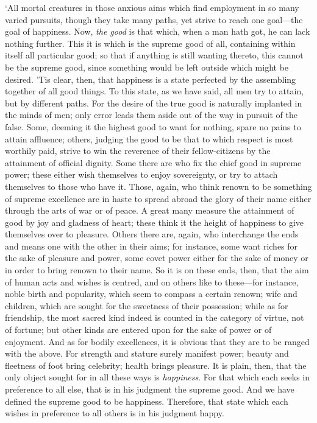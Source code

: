 \documentclass[12pt]{book}
\begin{document}
`All mortal creatures in those anxious aims which find employment in so
many varied pursuits, though they take many paths, yet strive to reach
one goal---the goal of happiness. Now, \emph{the good} is that which, when a
man hath got, he can lack nothing further. This it is which is the
supreme good of all, containing within itself all particular good; so
that if anything is still wanting thereto, this cannot be the supreme
good, since something would be left outside which might be desired. 'Tis
clear, then, that happiness is a state perfected by the assembling
together of all good things. To this state, as we have said, all men try
to attain, but by different paths. For the desire of the true good is
naturally implanted in the minds of men; only error leads them aside out
of the way in pursuit of the false. Some, deeming it the highest good to
want for nothing, spare no pains to attain affluence; others, judging
the good to be that to which respect is most worthily paid, strive to
win the reverence of their fellow-citizens by the attainment of official
dignity. Some there are who fix the chief good in supreme power; these
either wish themselves to enjoy sovereignty, or try to attach themselves
to those who have it. Those, again, who think renown to be something of
supreme excellence are in haste to spread abroad the glory of their name
either through the arts of war or of peace. A great many measure the
attainment of good by joy and gladness of heart; these think it the
height of happiness to give themselves over to pleasure. Others there
are, again, who interchange the ends and means one with the other in
their aims; for instance, some want riches for the sake of pleasure and
power, some covet power either for the sake of money or in order to
bring renown to their name. So it is on these ends, then, that the aim
of human acts and wishes is centred, and on others like to these---for
instance, noble birth and popularity, which seem to compass a certain
renown; wife and children, which are sought for the sweetness of their
possession; while as for friendship, the most sacred kind indeed is
counted in the category of virtue, not of fortune; but other kinds are
entered upon for the sake of power or of enjoyment. And as for bodily
excellences, it is obvious that they are to be ranged with the above.
For strength and stature surely manifest power; beauty and fleetness of
foot bring celebrity; health brings pleasure. It is plain, then, that
the only object sought for in all these ways is \emph{happiness}. For that
which each seeks in preference to all else, that is in his judgment the
supreme good. And we have defined the supreme good to be happiness.
Therefore, that state which each wishes in preference to all others is
in his judgment happy.
\end{document}
